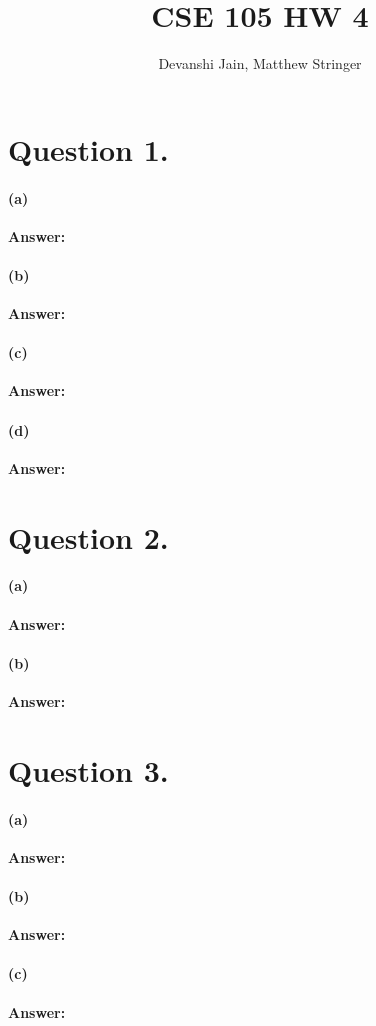 \documentclass{article}
\title{CSE 105 HW 4}
\author{
    Devanshi Jain, Matthew Stringer 
}
\theoremstyle{definition}
\renewcommand{\ques}[1]{\section*{Question #1.}}
\begin{document}
    \maketitle
    \ques{1}
    \paragraph{(a)}
        \textbf{Answer: } 
    \paragraph*{(b)}
        \textbf{Answer: }  
    \paragraph*{(c)}
        \textbf{Answer: } 
    \paragraph*{(d)}
        \textbf{Answer: }
    
    \ques{2}
    \paragraph*{(a)}
        \textbf{Answer: } 
    \paragraph*{(b)}
        \textbf{Answer: } 

    \ques{3}
    \paragraph*{(a)} 
        \textbf{Answer: } 
    \paragraph*{(b)}
        \textbf{Answer: }
    \paragraph*{(c)}
        \textbf{Answer: }
  
\end{document}
